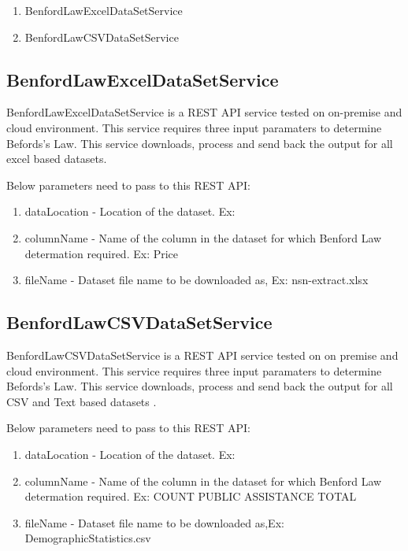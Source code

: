 \begin{enumerate}
 \item BenfordLawExcelDataSetService
 \item BenfordLawCSVDataSetService
\end{enumerate}

\subsection{BenfordLawExcelDataSetService}
BenfordLawExcelDataSetService is a REST API service tested on 
on-premise and cloud environment. This service requires three 
input paramaters to determine Befords's Law. This service
downloads, process and send back the output 
for all excel based datasets.

Below parameters need to pass to this REST API:

\begin{enumerate}
\item dataLocation - Location of the dataset. 
 Ex: ~\cite{hid-sp18-514-excelDatalocation}
\item columnName - Name of the column in the 
 dataset for which Benford Law determation required. 
 Ex: Price
\item fileName - Dataset file name to be downloaded 
 as, Ex: nsn-extract.xlsx
\end{enumerate}

\subsection{BenfordLawCSVDataSetService}
BenfordLawCSVDataSetService is a REST API service 
tested on on premise and cloud environment. 
This service requires three input paramaters to 
determine Befords's Law. This service
downloads, process and send back the output 
for all CSV and Text based datasets .

Below parameters need to pass to this REST API:

\begin{enumerate}
\item dataLocation - Location of the dataset. 
 Ex: ~\cite{hid-sp18-514-csvDatalocation}
\item columnName - Name of the column in the 
 dataset for which Benford Law determation required. 
 Ex: COUNT PUBLIC ASSISTANCE TOTAL
\item fileName - Dataset file name to be downloaded 
 as,Ex: DemographicStatistics.csv
\end{enumerate}


